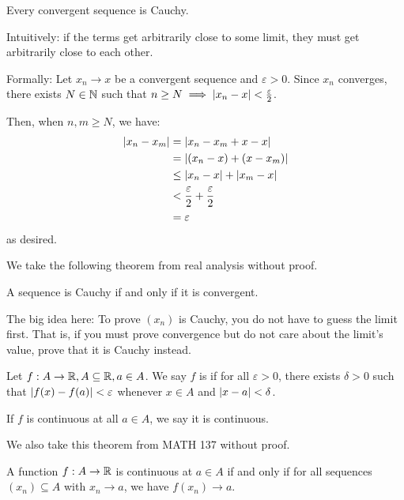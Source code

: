 \documentclass[class=pmath370,tikz,notes]{agony}
\begin{document}
\begin{prop}
  Every convergent sequence is Cauchy.
\end{prop}
\begin{prf}
  Intuitively: if the terms get arbitrarily close to some limit,
  they must get arbitrarily close to each other.

  Formally: Let $x_n \to x$ be a convergent sequence and $\varepsilon > 0$.
  Since $x_n$ converges, there exists $N \in \mathbb{N}$ such that
  $n \geq N \implies \abs{x_n-x} < \frac\varepsilon2$.

  Then, when $n,m \geq N$, we have:
  \begin{align*}
    \abs{x_n - x_m}
     & = \abs{x_n - x_m + x - x}               \\
     & = \abs{(x_n - x) + (x - x_m)}           \\
     & \leq \abs{x_n - x} + \abs{x_m - x}      \\
     & < \frac\varepsilon2 + \frac\varepsilon2 \\
     & = \varepsilon
  \end{align*}
  as desired.
\end{prf}

We take the following theorem from real analysis without proof.

\begin{theorem}[completeness of $\R$]
  A sequence is Cauchy if and only if it is convergent.
\end{theorem}

The big idea here: To prove $(x_n)$ is Cauchy,
you do not have to guess the limit first.
That is, if you must prove convergence but do not care about the limit's value,
prove that it is Cauchy instead.

\begin{defn*}
  Let $f : A \to \mathbb{R}, A \subseteq \mathbb{R}, a \in A$.
  We say $f$ is  if
  for all $\varepsilon > 0$, there exists $\delta > 0$
  such that $\abs{f(x) - f(a)} < \varepsilon$ whenever
  $x \in A$ and $\abs{x-a} < \delta$.

  If $f$ is continuous at all $a \in A$, we say it is continuous.
\end{defn*}

We also take this theorem from MATH 137 without proof.

\begin{theorem}
  A function $f : A \to \mathbb{R}$ is continuous at $a \in A$ if and only if
  for all sequences $(x_n) \subseteq A$ with $x_n \to a$,
  we have $f(x_n) \to a$.
\end{theorem}
\end{document}
